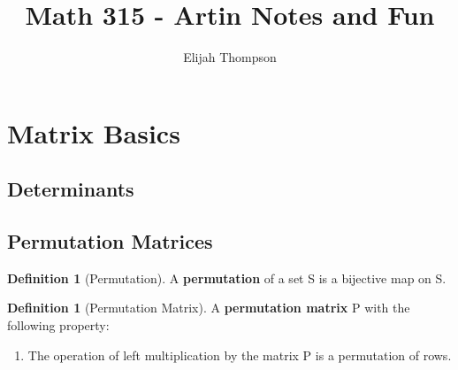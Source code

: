 \documentclass[12pt]{article}
\theoremstyle{definition}
\newtheorem{defn}[thm]{Definition}
\theoremstyle{remark}
\numberwithin{equation}{section}
\newcommand\B[1]{\textbf{ #1}}
\begin{document}

\title{Math 315 - Artin Notes and Fun}
\author{Elijah Thompson}
\maketitle

\tableofcontents


\clearpage



\section{Matrix Basics}

\subsection{Determinants}



\vspace{15pt}

\subsection{Permutation Matrices}

\begin{defn}[Permutation]
        A \B{permutation} of a set S is a bijective map on S.
\end{defn}


\vspace{15pt}


\begin{defn}[Permutation Matrix]
        A \B{permutation matrix} P with the following property:
        \begin{enumerate}
                \item[] The operation of left multiplication by the matrix P is a permutation of rows.
        \end{enumerate}
\end{defn}
\end{document}
